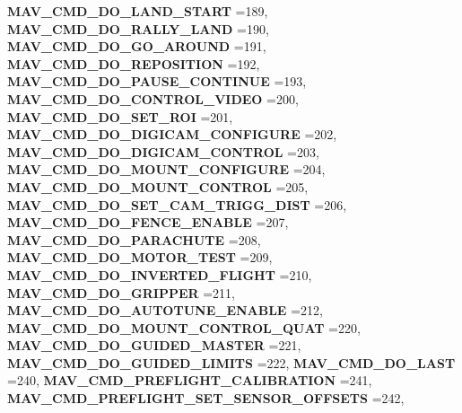 \begin{DoxyCompactItemize}
\textbf{ M\+A\+V\+\_\+\+C\+M\+D\+\_\+\+D\+O\+\_\+\+L\+A\+N\+D\+\_\+\+S\+T\+A\+RT} =189, 
\textbf{ M\+A\+V\+\_\+\+C\+M\+D\+\_\+\+D\+O\+\_\+\+R\+A\+L\+L\+Y\+\_\+\+L\+A\+ND} =190, 
\textbf{ M\+A\+V\+\_\+\+C\+M\+D\+\_\+\+D\+O\+\_\+\+G\+O\+\_\+\+A\+R\+O\+U\+ND} =191, 
\newline
\textbf{ M\+A\+V\+\_\+\+C\+M\+D\+\_\+\+D\+O\+\_\+\+R\+E\+P\+O\+S\+I\+T\+I\+ON} =192, 
\textbf{ M\+A\+V\+\_\+\+C\+M\+D\+\_\+\+D\+O\+\_\+\+P\+A\+U\+S\+E\+\_\+\+C\+O\+N\+T\+I\+N\+UE} =193, 
\textbf{ M\+A\+V\+\_\+\+C\+M\+D\+\_\+\+D\+O\+\_\+\+C\+O\+N\+T\+R\+O\+L\+\_\+\+V\+I\+D\+EO} =200, 
\textbf{ M\+A\+V\+\_\+\+C\+M\+D\+\_\+\+D\+O\+\_\+\+S\+E\+T\+\_\+\+R\+OI} =201, 
\newline
\textbf{ M\+A\+V\+\_\+\+C\+M\+D\+\_\+\+D\+O\+\_\+\+D\+I\+G\+I\+C\+A\+M\+\_\+\+C\+O\+N\+F\+I\+G\+U\+RE} =202, 
\textbf{ M\+A\+V\+\_\+\+C\+M\+D\+\_\+\+D\+O\+\_\+\+D\+I\+G\+I\+C\+A\+M\+\_\+\+C\+O\+N\+T\+R\+OL} =203, 
\textbf{ M\+A\+V\+\_\+\+C\+M\+D\+\_\+\+D\+O\+\_\+\+M\+O\+U\+N\+T\+\_\+\+C\+O\+N\+F\+I\+G\+U\+RE} =204, 
\textbf{ M\+A\+V\+\_\+\+C\+M\+D\+\_\+\+D\+O\+\_\+\+M\+O\+U\+N\+T\+\_\+\+C\+O\+N\+T\+R\+OL} =205, 
\newline
\textbf{ M\+A\+V\+\_\+\+C\+M\+D\+\_\+\+D\+O\+\_\+\+S\+E\+T\+\_\+\+C\+A\+M\+\_\+\+T\+R\+I\+G\+G\+\_\+\+D\+I\+ST} =206, 
\textbf{ M\+A\+V\+\_\+\+C\+M\+D\+\_\+\+D\+O\+\_\+\+F\+E\+N\+C\+E\+\_\+\+E\+N\+A\+B\+LE} =207, 
\textbf{ M\+A\+V\+\_\+\+C\+M\+D\+\_\+\+D\+O\+\_\+\+P\+A\+R\+A\+C\+H\+U\+TE} =208, 
\textbf{ M\+A\+V\+\_\+\+C\+M\+D\+\_\+\+D\+O\+\_\+\+M\+O\+T\+O\+R\+\_\+\+T\+E\+ST} =209, 
\newline
\textbf{ M\+A\+V\+\_\+\+C\+M\+D\+\_\+\+D\+O\+\_\+\+I\+N\+V\+E\+R\+T\+E\+D\+\_\+\+F\+L\+I\+G\+HT} =210, 
\textbf{ M\+A\+V\+\_\+\+C\+M\+D\+\_\+\+D\+O\+\_\+\+G\+R\+I\+P\+P\+ER} =211, 
\textbf{ M\+A\+V\+\_\+\+C\+M\+D\+\_\+\+D\+O\+\_\+\+A\+U\+T\+O\+T\+U\+N\+E\+\_\+\+E\+N\+A\+B\+LE} =212, 
\textbf{ M\+A\+V\+\_\+\+C\+M\+D\+\_\+\+D\+O\+\_\+\+M\+O\+U\+N\+T\+\_\+\+C\+O\+N\+T\+R\+O\+L\+\_\+\+Q\+U\+AT} =220, 
\newline
\textbf{ M\+A\+V\+\_\+\+C\+M\+D\+\_\+\+D\+O\+\_\+\+G\+U\+I\+D\+E\+D\+\_\+\+M\+A\+S\+T\+ER} =221, 
\textbf{ M\+A\+V\+\_\+\+C\+M\+D\+\_\+\+D\+O\+\_\+\+G\+U\+I\+D\+E\+D\+\_\+\+L\+I\+M\+I\+TS} =222, 
\textbf{ M\+A\+V\+\_\+\+C\+M\+D\+\_\+\+D\+O\+\_\+\+L\+A\+ST} =240, 
\textbf{ M\+A\+V\+\_\+\+C\+M\+D\+\_\+\+P\+R\+E\+F\+L\+I\+G\+H\+T\+\_\+\+C\+A\+L\+I\+B\+R\+A\+T\+I\+ON} =241, 
\newline
\textbf{ M\+A\+V\+\_\+\+C\+M\+D\+\_\+\+P\+R\+E\+F\+L\+I\+G\+H\+T\+\_\+\+S\+E\+T\+\_\+\+S\+E\+N\+S\+O\+R\+\_\+\+O\+F\+F\+S\+E\+TS} =242, 

\end{DoxyCompactItemize}
